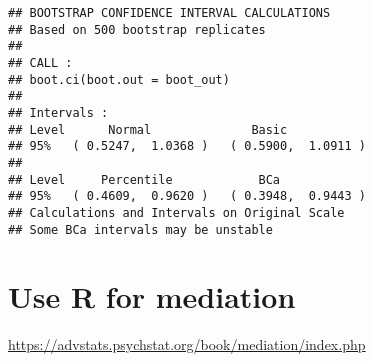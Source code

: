 \documentclass[]{book}
\begin{document}
\begin{verbatim}
## BOOTSTRAP CONFIDENCE INTERVAL CALCULATIONS
## Based on 500 bootstrap replicates
## 
## CALL : 
## boot.ci(boot.out = boot_out)
## 
## Intervals : 
## Level      Normal              Basic         
## 95%   ( 0.5247,  1.0368 )   ( 0.5900,  1.0911 )  
## 
## Level     Percentile            BCa          
## 95%   ( 0.4609,  0.9620 )   ( 0.3948,  0.9443 )  
## Calculations and Intervals on Original Scale
## Some BCa intervals may be unstable
\end{verbatim}

\hypertarget{use-r-for-mediation}{%
\section{Use R for mediation}\label{use-r-for-mediation}}

\url{https://advstats.psychstat.org/book/mediation/index.php}


\end{document}
